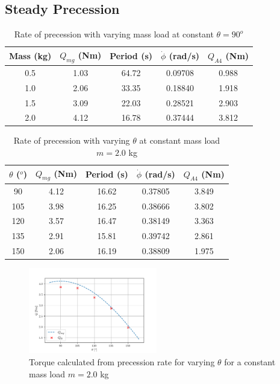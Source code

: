 \documentclass[8pt]{article}
\begin{document}
\subsection{Steady Precession}

\begin{table}[H]
    \centering
    \begin{tabular}{|c|c|c|c|c|}
        \hline
        Mass (kg) & $Q_{mg}$ (Nm) & Period (s) & $\dot{\phi}$ (rad/s) & $Q_{A4} $ (Nm) \\
        \hline
        0.5 & 1.03 & 64.72 & 0.09708 & 0.988\\
        1.0 & 2.06 & 33.35 & 0.18840 & 1.918\\
        1.5 & 3.09 & 22.03 & 0.28521 & 2.903\\
        2.0 & 4.12 & 16.78 & 0.37444 & 3.812\\
        \hline
    \end{tabular}
    \caption{Rate of precession with varying mass load at constant $\theta = 90^o$}
    \label{tab:precession_vs_mass}
\end{table}


\begin{table}[H]
    \centering
    \begin{tabular}{|c|c|c|c|c|}
        \hline
        $\theta$ ($^o$) & $Q_{mg}$ (Nm) & Period (s) & $\dot{\phi}$ (rad/s) & $Q_{A4} $ (Nm) \\
        \hline
        90 & 4.12 & 16.62 & 0.37805 & 3.849\\
        105 & 3.98 & 16.25 & 0.38666 & 3.802\\
        120 & 3.57 & 16.47 & 0.38149 & 3.363\\
        135 & 2.91 & 15.81 & 0.39742 & 2.861\\
        150 & 2.06 & 16.19 & 0.38809 & 1.975\\
        \hline
    \end{tabular}
    \caption{Rate of precession with varying $\theta$ at constant mass load $m = 2.0$ kg}
    \label{tab:precession_vs_theta}
\end{table}

\begin{figure}[H]
    \centering
    \includegraphics[width=0.5\textwidth]{precession_vs_theta.png}
    \caption{Torque calculated from precession rate for varying $\theta$ for a constant mass load $m = 2.0$ kg}
    \label{fig:precession_vs_theta}
\end{figure}
\end{document}
